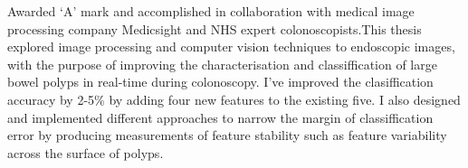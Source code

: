 Awarded `A' mark and accomplished in collaboration with medical image processing company Medicsight and NHS expert colonoscopists.This thesis explored image processing and computer vision techniques to endoscopic images, with the purpose of improving the characterisation and classiffication of large bowel polyps in real-time during colonoscopy.
I've improved the clasiffication accuracy by 2-5\% by adding four new features to the existing five.
I also designed and implemented different approaches to narrow the margin of classiffication error by producing measurements of feature stability such as feature variability across the surface of polyps.
